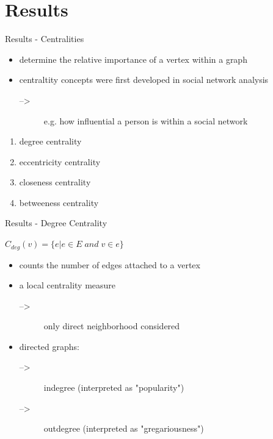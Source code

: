 \section{Results}
\begin{frame}{Results - Centralities}
	\begin{itemize}
		\item determine the relative importance of a vertex within a graph
		\item centraltity concepts were first developed in social network analysis
		\begin{description}
			\item[-->] e.g. how influential a person is within a social network
		\end{description}
	\end{itemize}
	
	\begin{definition}
		\begin{enumerate}
			\item degree centrality
			\item eccentricity centrality			
			\item closeness centrality
			\item betweeness centrality
		\end{enumerate}
	\end{definition}
\end{frame}
\begin{frame}{Results - Degree Centrality}
	\begin{definition}
		$C_{deg}(v) = \{e|e \in E\; and\; v \in e\}$
	\end{definition}
	\begin{itemize}
		\item counts the number of edges attached to a vertex
		\item a local centrality measure
		\begin{description}
			\item[-->] only direct neighborhood considered 
		\end{description}
		\item directed graphs:
		\begin{description}
			\item[-->] indegree (interpreted as "popularity")
			\item[-->] outdegree (interpreted as "gregariousness")
		\end{description}
	\end{itemize}
\end{frame}
